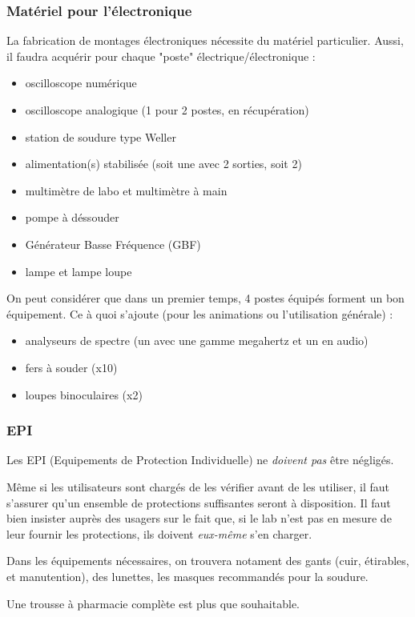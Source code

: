 \subsubsection{Matériel pour l'électronique}

La fabrication de montages électroniques nécessite du matériel particulier. Aussi, il faudra acquérir pour chaque "poste"
électrique/électronique :

\begin{itemize}
	\item oscilloscope numérique
	\item oscilloscope analogique (1 pour 2 postes, en récupération)
	\item station de soudure type Weller
	\item alimentation(s) stabilisée (soit une avec 2 sorties, soit 2)
	\item multimètre de labo et multimètre à main
	\item pompe à déssouder
	\item Générateur Basse Fréquence (GBF)
	\item lampe et lampe loupe
\end{itemize}

On peut considérer que dans un premier temps, 4 postes équipés forment un bon équipement.
Ce à quoi s'ajoute (pour les animations ou l'utilisation générale) :

\begin{itemize}
	\item analyseurs de spectre (un avec une gamme megahertz et un en audio)
	\item fers à souder (x10)
	\item loupes binoculaires (x2)
\end{itemize}

\subsubsection{EPI}

Les EPI (Equipements de Protection Individuelle) ne \textit{doivent pas} être négligés.

Même si les utilisateurs sont chargés de les vérifier avant de les utiliser, il faut s'assurer qu'un ensemble de
protections suffisantes seront à disposition. Il faut bien insister auprès des usagers sur le fait que, si le lab n'est
pas en mesure de leur fournir les protections, ils doivent \textit{eux-même} s'en charger.

Dans les équipements nécessaires, on trouvera notament des gants (cuir, étirables, et manutention), des lunettes, les
masques recommandés pour la soudure.

Une trousse à pharmacie complète est plus que souhaitable.

